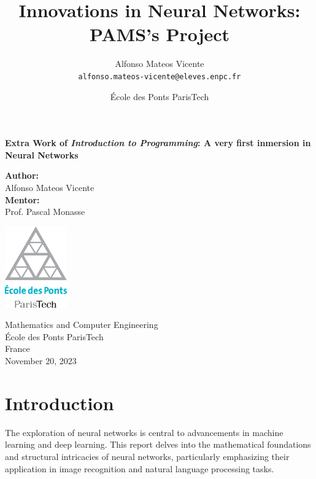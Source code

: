 \documentclass{article}
\title{Innovations in Neural Networks: PAMS's Project} %
\author{Alfonso Mateos Vicente\\ \texttt{alfonso.mateos-vicente@eleves.enpc.fr}} %
\date{École des Ponts ParisTech} %
\begin{document}
\begin{titlepage}
    \begin{center}
        \vspace*{1cm}
        
        \Huge
        \textbf{Extra Work of \textit{Introduction to Programming}: A very first inmersion in Neural Networks}
        
        \vspace{1.5cm}

        \Large
        \textbf{Author:} \\
        \vspace{0.25cm}
        \LARGE
        Alfonso Mateos Vicente \\
        \vspace{0.5cm}
        \Large
        \textbf{Mentor:} \\
        \vspace{0.25cm}
        \LARGE
        Prof. Pascal Monasse

        \vfill
        
        \includegraphics[width=0.2\textwidth]{./logo-enpc.eps}
        
        \vspace{1cm}
        
        \normalsize
        Mathematics and Computer Engineering \\
        École des Ponts ParisTech \\
        France \\
        November 20, 2023
    \end{center}
    \restoregeometry
\end{titlepage}


\newpage
\tableofcontents
\newpage


\section{Introduction}

The exploration of neural networks is central to advancements in machine learning and deep learning. This report delves into the mathematical foundations and structural intricacies of neural networks, particularly emphasizing their application in image recognition and natural language processing tasks.
\end{document}
